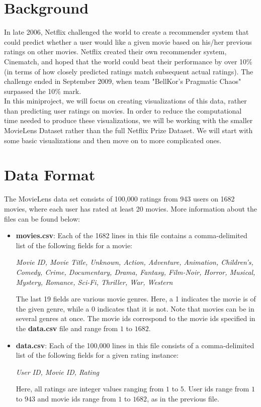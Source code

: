 \section{Background}
In late 2006, Netflix challenged the world to create a recommender system that could predict whether a user would like a given movie based on his/her previous ratings on other movies. Netflix created their own recommender system, Cinematch, and hoped that the world could beat their performance by over 10\% (in terms of how closely predicted ratings match subsequent actual ratings). The challenge ended in September 2009, when team "BellKor's Pragmatic Chaos" surpassed the 10\% mark. \\

In this miniproject, we will focus on creating visualizations of this data, rather than predicting user ratings on movies. In order to reduce the computational time needed to produce these visualizations, we will be working with the smaller MovieLens Dataset rather than the full Netflix Prize Dataset. We will start with some basic visualizations and then move on to more complicated ones.

\section{Data Format}
The MovieLens data set consists of 100,000 ratings from 943 users on 1682 movies, where each user has rated at least 20 movies. More information about the files can be found below:

\begin{itemize}
	\item \textbf{movies.csv}: Each of the 1682 lines in this file contains a comma-delimited list of the following fields for a movie:
		\begin{center}
		\textit{Movie ID, Movie Title, Unknown, Action, Adventure, Animation, Children’s, Comedy, Crime, Documentary, Drama, Fantasy, Film-Noir, Horror, Musical, Mystery, Romance, Sci-Fi, Thriller, War, Western}
		\end{center}
The last 19 fields are various movie genres. Here, a 1 indicates the movie is of the given genre, while a 0 indicates that it is not. Note that movies can be in several genres at once. The movie ids correspond to the movie ids specified in the \textbf{data.csv} file and range from $1$ to $1682$.
	\item \textbf{data.csv}: Each of the 100,000 lines in this file consists of a comma-delimited list of the following fields for a given rating instance:
		\begin{center}
		\textit{User ID, Movie ID, Rating}
		\end{center}
Here, all ratings are integer values ranging from $1$ to $5$. User ids range from $1$ to $943$ and movie ids range from $1$ to $1682$, as in the previous file.
\end{itemize}

